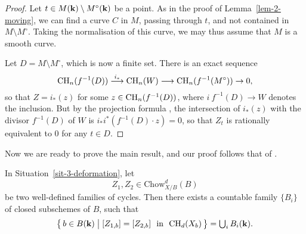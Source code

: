 \begin{proof}
    Let $t \in M(\bbk) \setminus M^\circ(\bbk)$ be a point.
    As in the proof of Lemma~\ref{lem-2-moving}, we can find
    a curve $C$ in $M$, passing through $t$, and not contained in $M \setminus M^\circ$.
    Taking the normalisation of this curve,
    we may thus assume that $M$ is a smooth curve.

    Let $D = M \setminus M^\circ$, which is now a finite set.
    There is an exact sequence \cite[\S1.8]{fulton}
    \[ \mathrm{CH}_n (f^{-1} (D)) \overset{i_*}{\longrightarrow} \mathrm{CH}_n (W) 
        \longrightarrow \mathrm{CH}_n (f^{-1} (M^\circ)) \to 0, \]
    so that $Z = i_* (z)$ for some $z \in \mathrm{CH}_n (f^{-1} (D))$,
    where $i \: f^{-1} (D) \to W$ denotes the inclusion.
    But by the projection formula \cite[\S2.3]{fulton}, the intersection of $i_* (z)$
    with the divisor $f^{-1} (D)$ of $W$ is 
    $i_* i^* (f^{-1}(D) \cdot z) = 0$, so that $Z_t$ is rationally equivalent to $0$ for any $t \in D$.
\end{proof}

Now we are ready to prove the main result,
and our proof follows that of \cite[Proposition~2.4]{voisin}.

\begin{theorem} [Voisin] \label{thm-3-locus-equality}
    In Situation~\textup{\ref{sit-3-deformation}}, let 
    \[ Z_1, Z_2 \in \mathrm{Chow}_{X/B}^{d} (B) \] 
    be two well-defined families of cycles.
    Then there exists a countable family $\{ B_i \}$
    of closed subschemes of $B$, such that
    \[ \textstyle
        \bigl\{ \, b \in B (\bbk) \bigm| 
        [Z_{1, b}] = [Z_{2, b}] \text{ \ in \ } {\CH_d (X_b)} \, \bigr\}
        = \bigcup_i B_i (\bbk).
    \]
\end{theorem}


